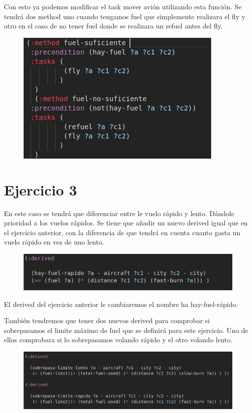 \documentclass[]{article}
\begin{document}
Con esto ya podemos modificar el task mover avión utilizando esta función. Se tendrá dos method uno cuando tengamos fuel que simplemente realizara el fly y otro en el caso de no tener fuel donde se realizara un refuel antes del fly.
\begin{figure}[H]
	\centering
	\includegraphics[width=0.7\linewidth]{screenshot004}
	\caption{}
	\label{fig:screenshot004}
\end{figure}

\section{Ejercicio 3}
En este caso se tendrá que diferenciar entre le vuelo rápido y lento. Dándole prioridad a los vuelos rápidos. Se tiene que añadir un nuevo derived igual que en el ejercicio anterior, con la diferencia de que tendrá en cuenta cuanto gasta un vuelo rápido en vez de uno lento.
\begin{figure}[H]
	\centering
	\includegraphics[width=0.7\linewidth]{screenshot006}
	\caption{}
	\label{fig:screenshot006}
\end{figure}
El derived del ejercicio anterior le cambiaremos el nombre ha hay-fuel-rápido.

También tendremos que tener dos nuevos derived para comprobar si sobrepasamos el limite máximo de fuel que se definirá para este ejercicio. Uno de ellos comprobara si lo sobrepasamos volando rápido y el otro volando lento.
\begin{figure}[H]
	\centering
	\includegraphics[width=0.7\linewidth]{screenshot007}
	\caption{}
	\label{fig:screenshot007}
\end{figure}
\end{document}
